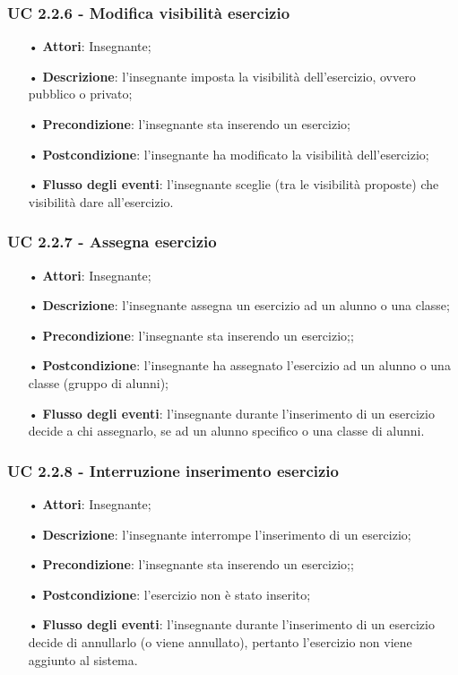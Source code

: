 \subsubsection{UC 2.2.6 - Modifica visibilità esercizio}
\begin{itemize}
	\item[•] \textbf{Attori}: Insegnante;
	\item[•] \textbf{Descrizione}: l'insegnante imposta la visibilità dell'esercizio, ovvero pubblico o privato;
	\item[•] \textbf{Precondizione}: l'insegnante sta inserendo un esercizio;
	\item[•] \textbf{Postcondizione}: l'insegnante ha modificato la visibilità dell'esercizio;
	\item[•] \textbf{Flusso degli eventi}: l'insegnante sceglie (tra le visibilità proposte) che visibilità dare all'esercizio.
\end{itemize}


\subsubsection{UC 2.2.7 - Assegna esercizio} 
\begin{itemize}
	\item[•] \textbf{Attori}: Insegnante;
	\item[•] \textbf{Descrizione}: l'insegnante assegna un esercizio ad un alunno o una classe;
	\item[•] \textbf{Precondizione}: l'insegnante sta inserendo un esercizio;;
	\item[•] \textbf{Postcondizione}: l'insegnante ha assegnato l'esercizio ad un alunno o una classe (gruppo di alunni);
	\item[•] \textbf{Flusso degli eventi}: l'insegnante durante l'inserimento di un esercizio decide a chi assegnarlo, se ad un alunno specifico o una classe di alunni.
\end{itemize}

\subsubsection{UC 2.2.8 - Interruzione inserimento esercizio}
\begin{itemize}
	\item[•] \textbf{Attori}: Insegnante;
	\item[•] \textbf{Descrizione}: l'insegnante interrompe l'inserimento di un esercizio;
	\item[•] \textbf{Precondizione}: l'insegnante sta inserendo un esercizio;;
	\item[•] \textbf{Postcondizione}: l'esercizio non è stato inserito;
	\item[•] \textbf{Flusso degli eventi}: l'insegnante durante l'inserimento di un esercizio decide di annullarlo (o viene annullato), pertanto l'esercizio non viene aggiunto al sistema.
\end{itemize}

